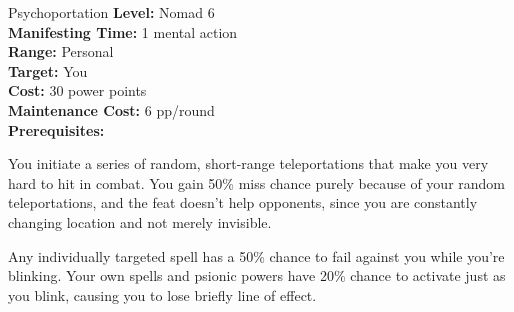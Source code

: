 {Psychoportation}
{
	\textbf{Level:}
	Nomad 6\\
	\textbf{Manifesting Time:}
	1 mental action\\
	\textbf{Range:}
	Personal\\
	\textbf{Target:}
	You\\
	\textbf{Cost:}
	30 power points\\
	\textbf{Maintenance Cost:}
	6 pp/round\\
	\textbf{Prerequisites:}
	\\
}
{
	You initiate a series of random, short-range teleportations that make you very hard to hit in combat. You gain 50\% miss chance purely because of your random teleportations, and the  feat doesn't help opponents, since you are constantly changing location and not merely invisible.

	Any individually targeted spell has a 50\% chance to fail against you while you're blinking. Your own spells and psionic powers have 20\% chance to activate just as you blink, causing you to lose briefly line of effect.
}